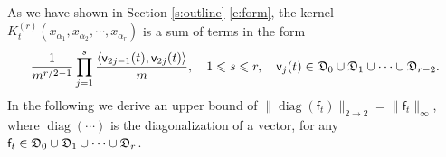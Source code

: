 \documentclass{article}
\numberwithin{equation}{section}
\newcommand{\fD}{{\frak D}}
\newcommand{\sff}{{\mathsf f}}
\newcommand{\sfv}{{\mathsf v}}
\newcommand{\al}{\alpha}
\DeclareMathOperator{\diag}{diag}
\renewcommand{\leq}{\leqslant}
\newcommand{\1}{\mathds{1}}
\theoremstyle{plain} %
\begin{document}
As we have shown in Section \ref{s:outline} \eqref{e:form}, the kernel $K^{(r)}_t(x_{\al_1}, x_{\al_2}, \cdots, x_{\al_r})$ is a sum of terms in the form
\begin{align}\label{e:formcopy}
\frac{1}{m^{r/2-1}}\prod_{j=1}^s \frac{\langle \sfv_{2j-1}(t),\sfv_{2j}(t)\rangle}{m}, \quad 1\leq s\leq r,\quad \sfv_j(t)\in \fD_0\cup \fD_1\cup \cdots \cup \fD_{r-2}.
\end{align}
In the following we derive an upper bound of $\|\diag(\sff_t)\|_{2\rightarrow 2}=\|\sff_t\|_\infty$, where $\diag(\cdots)$ is the diagonalization of a vector, for any $\sff_t\in \fD_0\cup\fD_1\cup\cdots\cup \fD_r$. 
\end{document}
